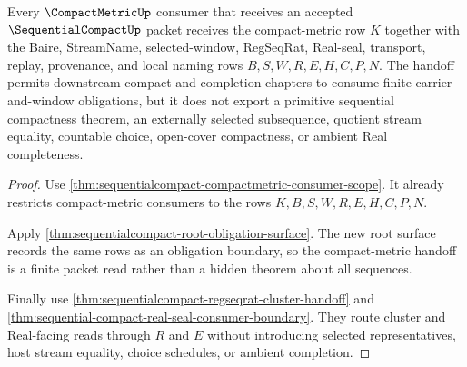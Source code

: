 \begin{theorem}
\label{thm:sequentialcompact-compactmetric-handoff}
Every $\CompactMetricUp$ consumer that receives an accepted $\SequentialCompactUp$ packet receives the compact-metric row $K$ together with the Baire, StreamName, selected-window, RegSeqRat, Real-seal, transport, replay, provenance, and local naming rows $B,S,W,R,E,H,C,P,N$. The handoff permits downstream compact and completion chapters to consume finite carrier-and-window obligations, but it does not export a primitive sequential compactness theorem, an externally selected subsequence, quotient stream equality, countable choice, open-cover compactness, or ambient Real completeness.
\end{theorem}
\begin{proof}
Use \autoref{thm:sequentialcompact-compactmetric-consumer-scope}. It already restricts compact-metric consumers to the rows $K,B,S,W,R,E,H,C,P,N$.

Apply \autoref{thm:sequentialcompact-root-obligation-surface}. The new root surface records the same rows as an obligation boundary, so the compact-metric handoff is a finite packet read rather than a hidden theorem about all sequences.

Finally use \autoref{thm:sequentialcompact-regseqrat-cluster-handoff} and \autoref{thm:sequential-compact-real-seal-consumer-boundary}. They route cluster and Real-facing reads through $R$ and $E$ without introducing selected representatives, host stream equality, choice schedules, or ambient completion.
\end{proof}

